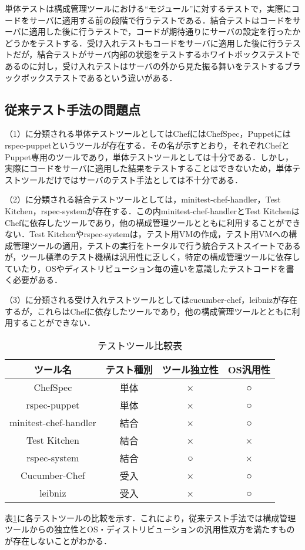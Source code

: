 単体テストは構成管理ツールにおける``モジュール''に対するテストで，実際にコードをサーバに適用する前の段階で行うテストである．結合テストはコードをサーバに適用した後に行うテストで，コードが期待通りにサーバの設定を行ったかどうかをテストする．受け入れテストもコードをサーバに適用した後に行うテストだが，結合テストがサーバ内部の状態をテストするホワイトボックステストであるのに対し，受け入れテストはサーバの外から見た振る舞いをテストするブラックボックステストであるという違いがある．

\subsection{従来テスト手法の問題点}

（1）に分類される単体テストツールとしてはChefにはChefSpec，Puppetにはrspec-puppetというツールが存在する．その名が示すとおり，それぞれChefとPuppet専用のツールであり，単体テストツールとしては十分である．しかし，実際にコードをサーバに適用した結果をテストすることはできないため，単体テストツールだけではサーバのテスト手法としては不十分である．

（2）に分類される結合テストツールとしては，minitest-chef-handler，Test Kitchen，rspec-systemが存在する．この内minitest-chef-handlerとTest KitchenはChefに依存したツールであり，他の構成管理ツールとともに利用することができない．Test Kitchenやrspec-systemは，テスト用VMの作成，テスト用VMへの構成管理ツールの適用，テストの実行をトータルで行う統合テストスイートであるが，ツール標準のテスト機構は汎用性に乏しく，特定の構成管理ツールに依存していたり，OSやディストリビューション毎の違いを意識したテストコードを書く必要がある．

（3）に分類される受け入れテストツールとしてはcucumber-chef，leibnizが存在するが，これらはChefに依存したツールであり，他の構成管理ツールとともに利用することができない．

\begin{table}[htb]
  \begin{center}
    \caption{テストツール比較表\label{tab:comparison}}
    \begin{tabular}{|c|c|c|c|}
      \hline
      ツール名 & テスト種別 & ツール独立性 & OS汎用性 \\
      \hline
      \hline
      ChefSpec              & 単体 & ×  & ○ \\
      \hline
      rspec-puppet          & 単体 & ×  & ○ \\
      \hline
      minitest-chef-handler & 結合 & ×  & ○ \\
      \hline
      Test Kitchen          & 結合 & ×  & × \\
      \hline
      rspec-system          & 結合 & ○ & × \\
      \hline
      Cucumber-Chef         & 受入 & ×  & ○ \\
      \hline
      leibniz               & 受入 & ×  & ○ \\
      \hline
    \end{tabular}
  \end{center}
\end{table}

表\ref{tab:comparison}に各テストツールの比較を示す．これにより，従来テスト手法では構成管理ツールからの独立性とOS・ディストリビューションの汎用性双方を満たすものが存在しないことがわかる．
